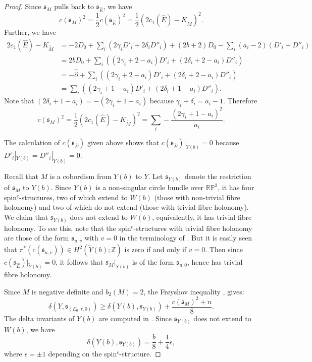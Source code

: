 \documentclass{amsart}
\theoremstyle{definition}
\theoremstyle{remark}
\numberwithin{equation}{section}
\begin{document}
\begin{proof}
Since $\mathfrak{s}_M$ pulls back to $\mathfrak{s}_{\widehat{E}}$, we have
\[
c(\mathfrak{s}_M)^2 = \frac{1}{2} c(\mathfrak{s}_{\widehat{E}})^2 = \frac{1}{2} ( 2c_1(\widehat{E}) - K_{\widetilde{M}})^2.
\]
Further, we have
\begin{align*}
2c_1(\widehat{E}) - K_{\widetilde{M}} &= -2D_0 + \sum_i (2\gamma_i D'_i + 2\delta_i D''_i) + (2b+2)D_0 - \sum_i ( a_i - 2)(D'_i + D''_i) \\
&= 2bD_0 + \sum_i ( (2\gamma_i + 2 - a_i)D'_i + (2\delta_i + 2 - a_i)D''_i ) \\
&= -\widehat{\partial} + \sum_i ( (2\gamma_i + 2 - a_i)D'_i + (2\delta_i + 2 - a_i)D''_i ) \\
&= \sum_i( (2\gamma_i + 1 - a_i)D'_i + (2\delta_i + 1 - a_i)D''_i ).
\end{align*}
Note that $(2\delta_i + 1-a_i) = -(2\gamma_i + 1 - a_i)$ because $\gamma_i + \delta_i = a_i - 1$. Therefore
\begin{equation}\label{equ:c2}
c(\mathfrak{s}_M)^2 = \frac{1}{2}(2c_1(\widehat{E}) - K_{\widetilde{M}})^2 = \sum_i -\frac{(2\gamma_i + 1 - a_i)^2}{a_i}.
\end{equation}

The calculation of $c(\mathfrak{s}_{\widehat{E}})$ given above shows that $c(\mathfrak{s}_{\widehat{E}})|_{\widetilde{Y}(b)} = 0$ because $D'_i|_{Y(b)} = D''_i|_{Y(b)} = 0$.

Recall that $M$ is a cobordism from $Y(b)$ to $Y$. Let $\mathfrak{s}_{Y(b)}$ denote the restriction of $\mathfrak{s}_M$ to $Y(b)$. Since $Y(b)$ is a non-singular circle bundle over $\mathbb{RP}^2$, it has four spin$^c$-structures, two of which extend to $W(b)$ (those with non-trivial fibre holonomy) and two of which do not extend (those with trivial fibre holonomy). We claim that $\mathfrak{s}_{Y(b)}$ does not extend to $W(b)$, equivalently, it has trivial fibre holonomy. To see this, note that the spin$^c$-structures with trivial fibre holonomy are those of the form $\mathfrak{s}_{u,v}$ with $v=0$ in the terminology of \cite[]{bar}. But it is easily seen that $\pi^*(c(\mathfrak{s}_{u,v})) \in H^2( \widetilde{Y}(b) ; \mathbb{Z})$ is zero if and only if $v=0$. Then since $c(\mathfrak{s}_{\widehat{E}})|_{\widetilde{Y}(b)} = 0$, it follows that $\mathfrak{s}_M|_{Y(b)}$ is of the form $\mathfrak{s}_{u,0}$, hence has trivial fibre holonomy.

Since $M$ is negative definite and $b_2(M) = 2$, the Fr\o yshov inequality \cite{fro}, \cite[Theorem 39.1.4]{km} gives:
\begin{equation}\label{equ:ineq1}
\delta( Y , \mathfrak{s}_{(E_0 , \tau , 0)} ) \ge \delta(Y(b)  ,\mathfrak{s}_{Y(b)} ) + \frac{ c(\mathfrak{s}_{M})^2 + n}{8}.
\end{equation}
The delta invariants of $Y(b)$ are computed in \cite[]{bar}. Since $\mathfrak{s}_{Y(b)}$ does not extend to $W(b)$, we have
\[
\delta(Y(b), \mathfrak{s}_{Y(b)}) = \frac{b}{8} + \frac{1}{4}\epsilon,
\]
where $\epsilon = \pm 1$ depending on the spin$^c$-structure.



\end{proof}
\end{document}
